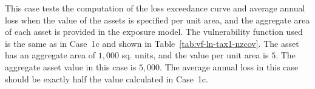 This case tests the computation of the loss exceedance curve and average annual loss when the value of the assets is specified per unit area, and the aggregate area of each asset is provided in the exposure model. The vulnerability function used is the same as in Case~1c and shown in Table~\ref{tab:vf-ln-tax1-nzcov}. The asset has an aggregate area of $1,000$ sq. units, and the value per unit area is $5$. The aggregate asset value in this case is $5,000$. The average annual loss in this case should be exactly half the value calculated in Case~1c.